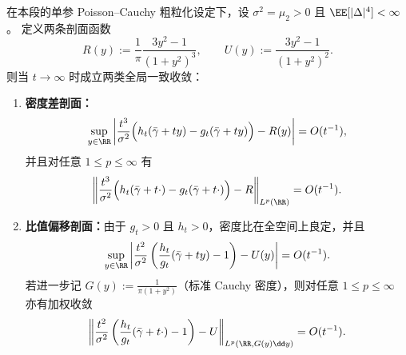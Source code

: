 \begin{proposition}\label{prop:cdim-poisson-second-order-profile-convergence}
在本段的单参 Poisson--Cauchy 粗粒化设定下，设 \(\sigma^2=\mu_2>0\) 且 \(\EE[|\Delta|^4]<\infty\)。
定义两条剖面函数
\[
R(y):=\frac{1}{\pi}\frac{3y^2-1}{(1+y^2)^3},
\qquad
U(y):=\frac{3y^2-1}{(1+y^2)^2}.
\]
则当 \(t\to\infty\) 时成立两类全局一致收敛：
\begin{enumerate}
  \item \textbf{密度差剖面：}
  \[
  \sup_{y\in\RR}\left|
  \frac{t^3}{\sigma^2}\Bigl(h_t(\bar\gamma+ty)-g_t(\bar\gamma+ty)\Bigr)-R(y)
  \right|=O(t^{-1}),
  \]
  并且对任意 \(1\le p\le\infty\) 有
  \[
  \left\|
  \frac{t^3}{\sigma^2}\Bigl(h_t(\bar\gamma+t\cdot)-g_t(\bar\gamma+t\cdot)\Bigr)-R
  \right\|_{L^p(\RR)}=O(t^{-1}).
  \]
  \item \textbf{比值偏移剖面：}由于 \(g_t>0\) 且 \(h_t>0\)，密度比在全空间上良定，并且
  \[
  \sup_{y\in\RR}\left|
  \frac{t^2}{\sigma^2}\left(\frac{h_t}{g_t}(\bar\gamma+ty)-1\right)-U(y)
  \right|=O(t^{-1}).
  \]
  若进一步记 \(G(y):=\frac{1}{\pi(1+y^2)}\)（标准 Cauchy 密度），则对任意 \(1\le p\le\infty\) 亦有加权收敛
  \[
  \left\|
  \frac{t^2}{\sigma^2}\left(\frac{h_t}{g_t}(\bar\gamma+t\cdot)-1\right)-U
  \right\|_{L^p(\RR,G(y)\dd y)}=O(t^{-1}).
  \]
\end{enumerate}
\end{proposition}
